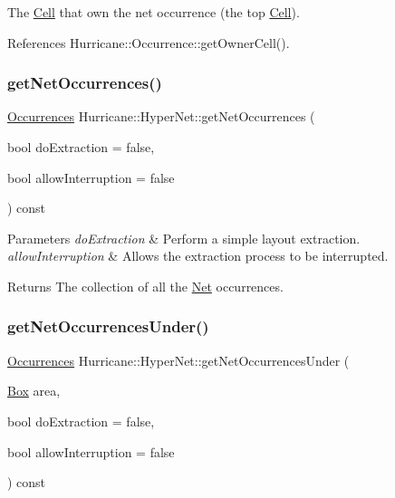 The \mbox{\hyperlink{classHurricane_1_1Cell}{Cell}} that own the net occurrence (the top \mbox{\hyperlink{classHurricane_1_1Cell}{Cell}}). 

References Hurricane\+::\+Occurrence\+::get\+Owner\+Cell().

\mbox{\label{classHurricane_1_1HyperNet_a02180e650b1f2e5b87bf4774a5799ebc}} 
\subsubsection{\texorpdfstring{get\+Net\+Occurrences()}{getNetOccurrences()}}
{\footnotesize\ttfamily \mbox{\hyperlink{namespaceHurricane_a1912927c128eee859af62dbe4cbe0a6b}{Occurrences}} Hurricane\+::\+Hyper\+Net\+::get\+Net\+Occurrences (\begin{DoxyParamCaption}\item[{bool}]{do\+Extraction = {\ttfamily false},  }\item[{bool}]{allow\+Interruption = {\ttfamily false} }\end{DoxyParamCaption}) const}


\begin{DoxyParams}{Parameters}
{\em do\+Extraction} & Perform a simple layout extraction. \\
\hline
{\em allow\+Interruption} & Allows the extraction process to be interrupted. \\
\hline
\end{DoxyParams}
\begin{DoxyReturn}{Returns}
The collection of all the \mbox{\hyperlink{classHurricane_1_1Net}{Net}} occurrences. 
\end{DoxyReturn}
\mbox{\label{classHurricane_1_1HyperNet_ab278267a5f1d91bd22bc7fe411b3cfb0}} 
\subsubsection{\texorpdfstring{get\+Net\+Occurrences\+Under()}{getNetOccurrencesUnder()}}
{\footnotesize\ttfamily \mbox{\hyperlink{namespaceHurricane_a1912927c128eee859af62dbe4cbe0a6b}{Occurrences}} Hurricane\+::\+Hyper\+Net\+::get\+Net\+Occurrences\+Under (\begin{DoxyParamCaption}\item[{\mbox{\hyperlink{classHurricane_1_1Box}{Box}}}]{area,  }\item[{bool}]{do\+Extraction = {\ttfamily false},  }\item[{bool}]{allow\+Interruption = {\ttfamily false} }\end{DoxyParamCaption}) const}


